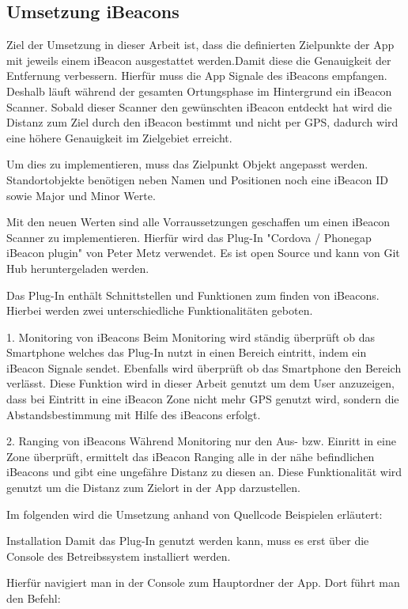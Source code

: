 \subsection{Umsetzung iBeacons}
Ziel der Umsetzung in dieser Arbeit ist, dass die definierten Zielpunkte der App mit jeweils einem iBeacon ausgestattet werden.Damit diese die Genauigkeit der Entfernung verbessern.
Hierfür muss die App Signale des iBeacons empfangen. Deshalb läuft während der gesamten Ortungsphase im Hintergrund ein iBeacon Scanner. Sobald dieser Scanner den gewünschten iBeacon entdeckt hat wird die Distanz zum Ziel durch den iBeacon bestimmt und nicht per GPS, dadurch wird eine höhere Genauigkeit im Zielgebiet erreicht.

Um dies zu implementieren, muss das Zielpunkt Objekt angepasst werden. Standortobjekte benötigen neben Namen und Positionen noch eine iBeacon ID sowie Major und Minor Werte.

Mit den neuen Werten sind alle Vorraussetzungen geschaffen um einen iBeacon Scanner zu implementieren. Hierfür wird das Plug-In "Cordova / Phonegap iBeacon plugin" von Peter Metz verwendet. Es ist open Source und kann von Git Hub heruntergeladen werden.

Das Plug-In enthält Schnittstellen und Funktionen zum finden von iBeacons. Hierbei werden zwei unterschiedliche Funktionalitäten geboten.


1. Monitoring von iBeacons
Beim Monitoring wird ständig überprüft ob das Smartphone welches das Plug-In nutzt in einen Bereich eintritt, indem ein iBeacon Signale sendet. Ebenfalls wird überprüft ob das Smartphone den Bereich verlässt. Diese Funktion wird in dieser Arbeit genutzt um dem User anzuzeigen, dass bei Eintritt in eine iBeacon Zone nicht mehr GPS genutzt wird, sondern die Abstandsbestimmung mit Hilfe des iBeacons erfolgt.

2. Ranging von iBeacons
Während Monitoring nur den Aus- bzw. Einritt in eine Zone überprüft, ermittelt das iBeacon Ranging alle in der nähe befindlichen iBeacons und gibt eine ungefähre Distanz zu diesen an. Diese Funktionalität wird genutzt um die Distanz zum Zielort in der App darzustellen.\cite{MonitorRange}


Im folgenden wird die Umsetzung anhand von Quellcode Beispielen erläutert:

Installation
Damit das Plug-In genutzt werden kann, muss es erst über die Console des Betreibssystem installiert werden.

Hierfür navigiert man in der Console zum Hauptordner der App. Dort führt man den Befehl:

